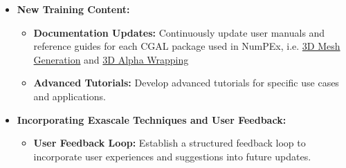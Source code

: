\begin{itemize}
    \item \textbf{New Training Content:}
    \begin{itemize}
        \item \textbf{Documentation Updates:} Continuously update user manuals and reference guides for each CGAL package used in NumPEx, i.e. \href{https://doc.cgal.org/latest/Mesh_3/index.html}{3D Mesh Generation} and    \href{https://doc.cgal.org/latest/Alpha_wrap_3/index.html}{3D Alpha Wrapping}
        \item \textbf{Advanced Tutorials:} Develop advanced tutorials for specific use cases and applications.
    \end{itemize}

    \item \textbf{Incorporating Exascale Techniques and User Feedback:}
    \begin{itemize}
        \item \textbf{User Feedback Loop:} Establish a structured feedback loop to incorporate user experiences and suggestions into future updates.
    \end{itemize}

\end{itemize}
